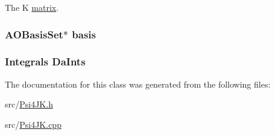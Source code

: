 The K \hyperlink{classJKBuilder_1_1matrix}{matrix}. \hypertarget{classJKBuilder_1_1JK_a81392b84b45d3cf84c5c105e9fd5d09c}{
\subsubsection[{basis}]{\setlength{\rightskip}{0pt plus 5cm}AOBasisSet$\ast$ {\bf basis}}}
\label{classJKBuilder_1_1JK_a81392b84b45d3cf84c5c105e9fd5d09c}
\hypertarget{classJKBuilder_1_1JK_ad95ede2076c192d856848b3635efc38e}{
\subsubsection[{DaInts}]{\setlength{\rightskip}{0pt plus 5cm}Integrals {\bf DaInts}}}
\label{classJKBuilder_1_1JK_ad95ede2076c192d856848b3635efc38e}


The documentation for this class was generated from the following files:\begin{DoxyCompactItemize}
\item 
src/\hyperlink{Psi4JK_8h}{Psi4JK.h}\item 
src/\hyperlink{Psi4JK_8cpp}{Psi4JK.cpp}\end{DoxyCompactItemize}
